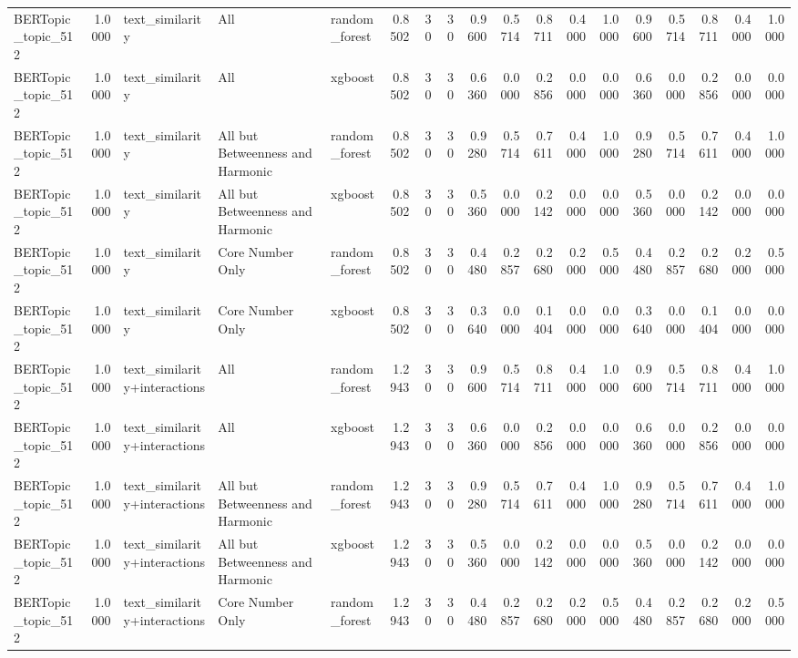 \begin{tabular}{lrlllrrrrrrrrrrrrr}
BERTopic_topic_512 & 1.0000 & text_similarity & All & random_forest & 0.8502 & 30 & 30 & 0.9600 & 0.5714 & 0.8711 & 0.4000 & 1.0000 & 0.9600 & 0.5714 & 0.8711 & 0.4000 & 1.0000 \\
BERTopic_topic_512 & 1.0000 & text_similarity & All & xgboost & 0.8502 & 30 & 30 & 0.6360 & 0.0000 & 0.2856 & 0.0000 & 0.0000 & 0.6360 & 0.0000 & 0.2856 & 0.0000 & 0.0000 \\
BERTopic_topic_512 & 1.0000 & text_similarity & All but Betweenness and Harmonic & random_forest & 0.8502 & 30 & 30 & 0.9280 & 0.5714 & 0.7611 & 0.4000 & 1.0000 & 0.9280 & 0.5714 & 0.7611 & 0.4000 & 1.0000 \\
BERTopic_topic_512 & 1.0000 & text_similarity & All but Betweenness and Harmonic & xgboost & 0.8502 & 30 & 30 & 0.5360 & 0.0000 & 0.2142 & 0.0000 & 0.0000 & 0.5360 & 0.0000 & 0.2142 & 0.0000 & 0.0000 \\
BERTopic_topic_512 & 1.0000 & text_similarity & Core Number Only & random_forest & 0.8502 & 30 & 30 & 0.4480 & 0.2857 & 0.2680 & 0.2000 & 0.5000 & 0.4480 & 0.2857 & 0.2680 & 0.2000 & 0.5000 \\
BERTopic_topic_512 & 1.0000 & text_similarity & Core Number Only & xgboost & 0.8502 & 30 & 30 & 0.3640 & 0.0000 & 0.1404 & 0.0000 & 0.0000 & 0.3640 & 0.0000 & 0.1404 & 0.0000 & 0.0000 \\
BERTopic_topic_512 & 1.0000 & text_similarity+interactions & All & random_forest & 1.2943 & 30 & 30 & 0.9600 & 0.5714 & 0.8711 & 0.4000 & 1.0000 & 0.9600 & 0.5714 & 0.8711 & 0.4000 & 1.0000 \\
BERTopic_topic_512 & 1.0000 & text_similarity+interactions & All & xgboost & 1.2943 & 30 & 30 & 0.6360 & 0.0000 & 0.2856 & 0.0000 & 0.0000 & 0.6360 & 0.0000 & 0.2856 & 0.0000 & 0.0000 \\
BERTopic_topic_512 & 1.0000 & text_similarity+interactions & All but Betweenness and Harmonic & random_forest & 1.2943 & 30 & 30 & 0.9280 & 0.5714 & 0.7611 & 0.4000 & 1.0000 & 0.9280 & 0.5714 & 0.7611 & 0.4000 & 1.0000 \\
BERTopic_topic_512 & 1.0000 & text_similarity+interactions & All but Betweenness and Harmonic & xgboost & 1.2943 & 30 & 30 & 0.5360 & 0.0000 & 0.2142 & 0.0000 & 0.0000 & 0.5360 & 0.0000 & 0.2142 & 0.0000 & 0.0000 \\
BERTopic_topic_512 & 1.0000 & text_similarity+interactions & Core Number Only & random_forest & 1.2943 & 30 & 30 & 0.4480 & 0.2857 & 0.2680 & 0.2000 & 0.5000 & 0.4480 & 0.2857 & 0.2680 & 0.2000 & 0.5000 \\

\end{tabular}
